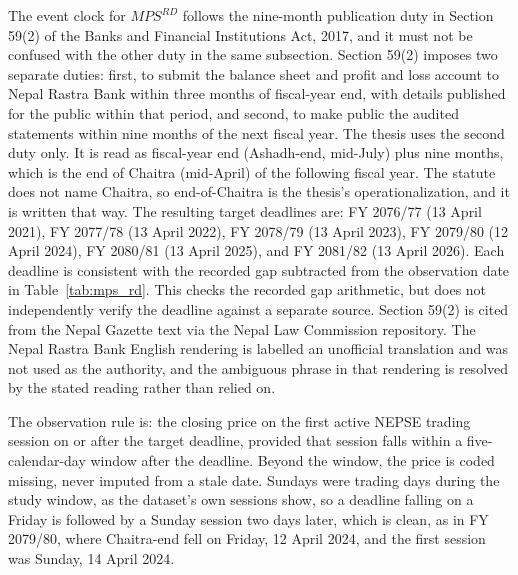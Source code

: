 The event clock for $\mathit{MPS}^{RD}$ follows the nine-month publication duty in Section 59(2) of the Banks and Financial Institutions Act, 2017, and it must not be confused with the other duty in the same subsection. Section 59(2) imposes two separate duties: first, to submit the balance sheet and profit and loss account to Nepal Rastra Bank within three months of fiscal-year end, with details published for the public within that period, and second, to make public the audited statements within nine months of the next fiscal year. The thesis uses the second duty only. It is read as fiscal-year end (Ashadh-end, mid-July) plus nine months, which is the end of Chaitra (mid-April) of the following fiscal year. The statute does not name Chaitra, so end-of-Chaitra is the thesis's operationalization, and it is written that way. The resulting target deadlines are: FY 2076/77 (13 April 2021), FY 2077/78 (13 April 2022), FY 2078/79 (13 April 2023), FY 2079/80 (12 April 2024), FY 2080/81 (13 April 2025), and FY 2081/82 (13 April 2026). Each deadline is consistent with the recorded gap subtracted from the observation date in Table~\ref{tab:mps_rd}. This checks the recorded gap arithmetic, but does not independently verify the deadline against a separate source. Section 59(2) is cited from the Nepal Gazette text via the Nepal Law Commission repository. The Nepal Rastra Bank English rendering is labelled an unofficial translation and was not used as the authority, and the ambiguous phrase in that rendering is resolved by the stated reading rather than relied on.

The observation rule is: the closing price on the first active NEPSE trading session on or after the target deadline, provided that session falls within a five-calendar-day window after the deadline. Beyond the window, the price is coded missing, never imputed from a stale date. Sundays were trading days during the study window, as the dataset's own sessions show, so a deadline falling on a Friday is followed by a Sunday session two days later, which is clean, as in FY 2079/80, where Chaitra-end fell on Friday, 12 April 2024, and the first session was Sunday, 14 April 2024.

